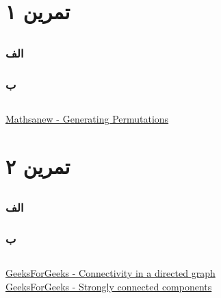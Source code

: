 \documentclass[]{article}
\begin{document}
\section*{تمرین ۱}


\subsection*{\color{blue}{جواب}}
\subsubsection*{الف}


\subsubsection*{ب}


\subsection*{\color{red}{مراجع}}
\begin{latin}
\href{https://mathsanew.com/articles/generating\_permutations.pdf}{Mathsanew - Generating Permutations}
\end{latin}

\pagebreak
\section*{تمرین ۲}


\subsection*{\color{blue}{جواب}}
\subsubsection*{الف}


\subsubsection*{ب}

\subsection*{\color{red}{مراجع}}
\begin{latin}
\href{https://www.geeksforgeeks.org/connectivity-in-a-directed-graph/}{GeeksForGeeks - Connectivity in a directed graph}\\
\href{https://www.geeksforgeeks.org/strongly-connected-components/}{GeeksForGeeks - Strongly connected components}
\end{latin}
\end{document}
